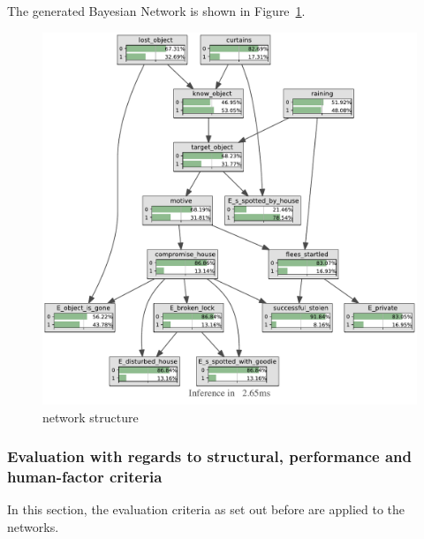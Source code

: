 The generated Bayesian Network is shown in Figure~\ref{laptop}.

\begin{figure}[htbp]
\begin{center}
\includegraphics[width=\linewidth]{../experiments/StolenLaptop/bnImage/BNIMAGEStolenLaptop.pdf}
\end{center}
\caption{network structure}
\label{laptop}
\end{figure}


\subsubsection{Evaluation with regards to structural, performance and human-factor criteria}
In this section, the evaluation criteria as set out before are applied to the networks.


